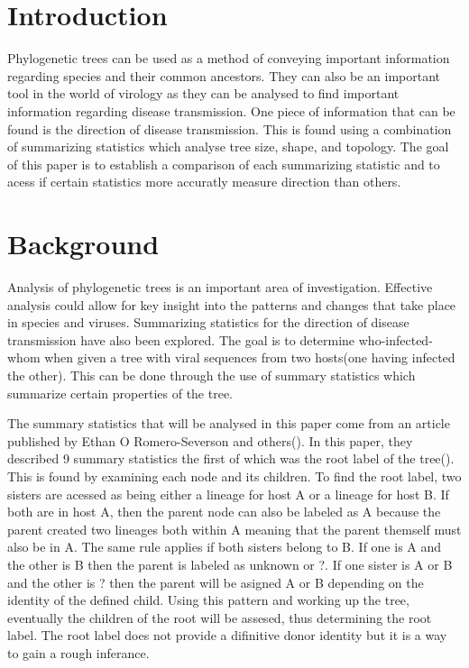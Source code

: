 \documentclass[final,5p,times,twocolumn,authoryear]{elsarticle}
\begin{document}



\section{Introduction}
\label{introduction}

Phylogenetic trees can be used as a method of conveying important information regarding species and their common ancestors. They can also be an important tool in the world of virology as they can be analysed to find important information regarding disease transmission. One piece of information that can be found is the direction of disease transmission. This is found using a combination of summarizing statistics which analyse tree size, shape, and topology. The goal of this paper is to establish a comparison of each summarizing statistic and to acess if certain statistics more accuratly measure direction than others.

\section{Background}
\label{background}

Analysis of phylogenetic trees is an important area of investigation. Effective analysis could allow for key insight into the patterns and changes that take place in species and viruses. Summarizing statistics for the direction of disease transmission have also been explored. The goal is to determine who-infected-whom when given a tree with viral sequences from two hosts(one having infected the other). This can be done through the use of summary statistics which summarize certain properties of the tree.

The summary statistics that will be analysed in this paper come from an article published by Ethan O Romero-Severson and others(\cite{10.1534/genetics.117.300284}). In this paper, they described 9 summary statistics the first of which was the root label of the tree(\cite{doi:10.1073/pnas.1522930113}). This is found by examining each node and its children. To find the root label, two sisters are acessed as being either a lineage for host A or a lineage for host B. If both are in host A, then the parent node can also be labeled as A because the parent created two lineages both within A meaning that the parent themself must also be in A. The same rule applies if both sisters belong to B. If one is A and the other is B then the parent is labeled as unknown or ?. If one sister is A or B and the other is ? then the parent will be asigned A or B depending on the identity of the defined child. Using this pattern and working up the tree, eventually the children of the root will be assesed, thus determining the root label. The root label does not provide a difinitive donor identity but it is a way to gain a rough inferance.
\end{document}
